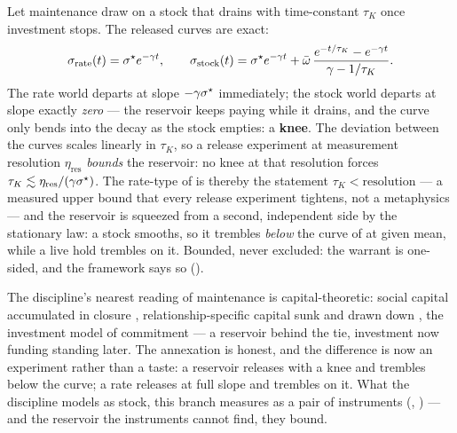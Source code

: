 \documentclass[../main]{subfiles}
\begin{document}
\begin{proposition}%
  Let maintenance draw on a stock that drains with time-constant $\tau_K$ once
  investment stops. The released curves are exact:
  \begin{equation}
    \sigma_{\mathrm{rate}}(t)=\sigma\sp{\star} e^{-\gamma t},\qquad
    \sigma_{\mathrm{stock}}(t)=\sigma\sp{\star} e^{-\gamma t}
      +\bar{\omega}\,\frac{e^{-t/\tau_K}-e^{-\gamma t}}{\gamma-1/\tau_K}.
    \label{eq:maint:knee}
  \end{equation}
  The rate world departs at slope $-\gamma\sigma\sp{\star}$ immediately; the stock world
  departs at slope exactly \emph{zero} --- the reservoir keeps paying while it drains,
  and the curve only bends into the decay as the stock empties: a \textbf{knee}. The
  deviation between the curves scales linearly in $\tau_K$, so a release experiment at
  measurement resolution $\eta_{\mathrm{res}}$ \emph{bounds} the reservoir: no knee at
  that resolution forces $\tau_K\lesssim\eta_{\mathrm{res}}/(\gamma\sigma\sp{\star})$.
  The rate-type of  is thereby the statement $\tau_K<\text{resolution}$
  --- a measured upper bound that every release experiment tightens, not a metaphysics
  --- and the reservoir is squeezed from a second, independent side by the stationary
  law: a stock smooths, so it trembles \emph{below} the curve of
   at given mean, while a live hold trembles on it. Bounded,
  never excluded: the warrant is one-sided, and the framework says so
  ().
\end{proposition}

\begin{econ}[label=e:stock, title={Relational capital, given its instrument}, ref=maint:knee,
  cites={a:coleman,a:beckerhh,a:rusbult}, departs=annex,
  stopsat={models the held tie as a stock; the knee and the curve are the measured difference}]
  The discipline's nearest reading of maintenance is capital-theoretic: social capital
  accumulated in closure \parencite{a:coleman}, relationship-specific capital sunk and
  drawn down \parencite{a:beckerhh}, the investment model of commitment
  \parencite{a:rusbult} --- a reservoir behind the tie, investment now
  funding standing later. The annexation is honest, and the difference is now an
  experiment rather than a taste: a reservoir releases with a knee and trembles below
  the curve; a rate releases at full slope and trembles on it. What the discipline
  models as stock, this branch measures as a pair of instruments (,
  ) --- and the reservoir the instruments cannot find, they
  bound.
\end{econ}
\end{document}
